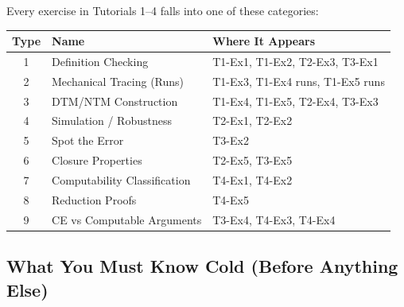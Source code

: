 \documentclass[11pt,a4paper]{article}
\begin{document}
Every exercise in Tutorials 1--4 falls into one of these categories:

\begin{center}
\renewcommand{\arraystretch}{1.4}
\begin{tabular}{c|l|l}
\toprule
\textbf{Type} & \textbf{Name} & \textbf{Where It Appears} \\
\midrule
1 & Definition Checking & T1-Ex1, T1-Ex2, T2-Ex3, T3-Ex1 \\
2 & Mechanical Tracing (Runs) & T1-Ex3, T1-Ex4 runs, T1-Ex5 runs \\
3 & DTM/NTM Construction & T1-Ex4, T1-Ex5, T2-Ex4, T3-Ex3 \\
4 & Simulation / Robustness & T2-Ex1, T2-Ex2 \\
5 & Spot the Error & T3-Ex2 \\
6 & Closure Properties & T2-Ex5, T3-Ex5 \\
7 & Computability Classification & T4-Ex1, T4-Ex2 \\
8 & Reduction Proofs & T4-Ex5 \\
9 & CE vs Computable Arguments & T3-Ex4, T4-Ex3, T4-Ex4 \\
\bottomrule
\end{tabular}
\end{center}

\subsection{What You Must Know Cold (Before Anything Else)}
\end{document}
